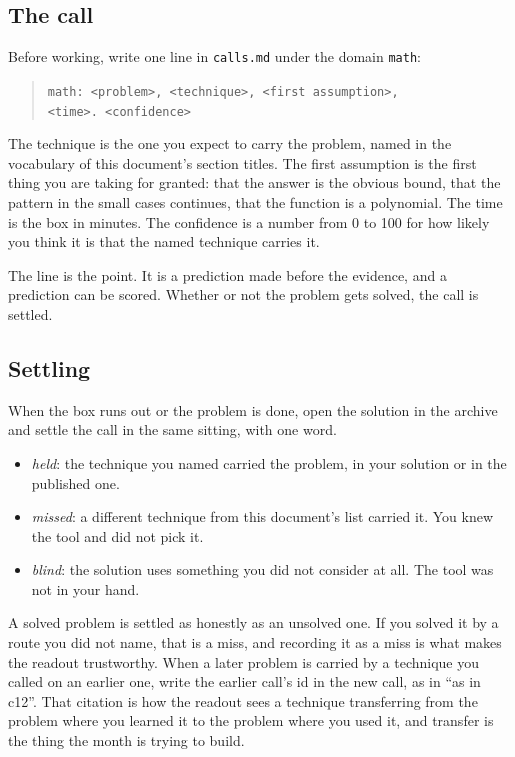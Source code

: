\subsection*{The call}

Before working, write one line in \texttt{calls.md} under the domain \texttt{math}:

\begin{quote}\small
\texttt{math: <problem>, <technique>, <first assumption>,}\\
\texttt{\phantom{math: }<time>. <confidence>}
\end{quote}

The technique is the one you expect to carry the problem, named in the vocabulary of this document's section titles. The first assumption is the first thing you are taking for granted: that the answer is the obvious bound, that the pattern in the small cases continues, that the function is a polynomial. The time is the box in minutes. The confidence is a number from 0 to 100 for how likely you think it is that the named technique carries it.

The line is the point. It is a prediction made before the evidence, and a prediction can be scored. Whether or not the problem gets solved, the call is settled.

\subsection*{Settling}

When the box runs out or the problem is done, open the solution in the archive and settle the call in the same sitting, with one word.

\begin{itemize}[nosep,leftmargin=*]
\item \emph{held}: the technique you named carried the problem, in your solution or in the published one.
\item \emph{missed}: a different technique from this document's list carried it. You knew the tool and did not pick it.
\item \emph{blind}: the solution uses something you did not consider at all. The tool was not in your hand.
\end{itemize}

A solved problem is settled as honestly as an unsolved one. If you solved it by a route you did not name, that is a miss, and recording it as a miss is what makes the readout trustworthy. When a later problem is carried by a technique you called on an earlier one, write the earlier call's id in the new call, as in ``as in c12''. That citation is how the readout sees a technique transferring from the problem where you learned it to the problem where you used it, and transfer is the thing the month is trying to build.

